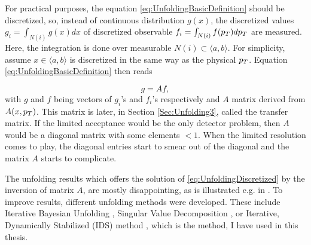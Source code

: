 For practical purposes, the equation \eqref{eq:UnfoldingBasicDefinition} should
be discretized, so, instead of continuous distribution $g(x)$, the discretized
values $g_i = \int_{N(i)} g(x)dx$ of discretized observable $f_i =
\int_{N(i)} f(p_{T})dp_{T}$ are measured. Here, the integration is done over
measurable $N(i) \subset \langle a, b \rangle$. For simplicity, assume $x \in
\langle a, b \rangle$ is discretized in the same way as the physical $p_{T}$.
Equation \eqref{eq:UnfoldingBasicDefinition} then reads

\begin{equation}
  g = Af,
  \label{eq:UnfoldingDiscretized}
\end{equation}
with $g$ and $f$ being vectors of $g_i$'s and $f_i$'s respectively and $A$
matrix derived from $A(x, p_{T})$. This matrix is later, in Section
\ref{Sec:Unfolding3}, called the transfer matrix. If the limited acceptance
would be the only detector problem, then $A$ would be a diagonal matrix with some
elements $ < 1$. When the limited resolution comes to play, the diagonal entries
start to smear out of the diagonal and the matrix $A$ starts to complicate.

The unfolding results which offers the solution of
\eqref{eq:UnfoldingDiscretized} by the inversion of matrix $A$, are mostly
disappointing, as is illustrated e.g. in \cite{UnfoldingExplained}. To improve
results, different unfolding methods were developed. These include Iterative
Bayesian Unfolding \cite{IterativeBayesianUnfolding}, Singular Value
Decomposition \cite{SingularValueDecomposition}, or Iterative, Dynamically
Stabilized (IDS) method \cite{IterativeDynamicallyStabilized}, which is the
method, I have used in this thesis. 



